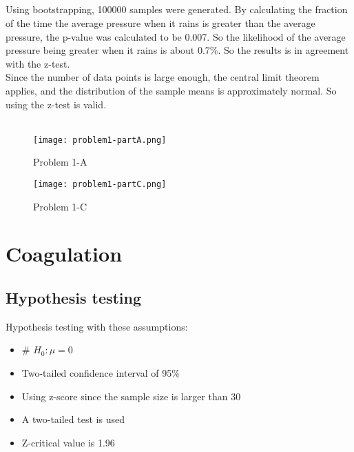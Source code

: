 \documentclass[12pt]{article}
\begin{document}
\subsection{}\label{subsec:problem-1-c}
Using bootstrapping, 100000 samples were generated.
By calculating the fraction of the time the average pressure when it rains is greater than the average pressure, the p-value was calculated to be 0.007.
So the likelihood of the average pressure being greater when it rains is about 0.7\%.
So the results is in agreement with the z-test.\\
Since the number of data points is large enough, the central limit theorem applies, and the distribution of the sample means is approximately normal.
So using the z-test is valid.\\
\\

\begin{figure}
\begin{center}
\texttt{[image: problem1-partA.png]}
\caption{Problem 1-A}
\end{center}
\end{figure}

\begin{figure}
\begin{center}
\texttt{[image: problem1-partC.png]}
\caption{Problem 1-C}
\end{center}
\end{figure}

\newpage
\section{Coagulation}\label{sec:problem-2}
\subsection{Hypothesis testing}\label{subsec:problem-2-a}
Hypothesis testing with these assumptions:
    \begin{itemize}
        \item # $H_0: \mu = 0$
        \item Two-tailed confidence interval of 95\%
        \item Using z-score since the sample size is larger than 30
        \item A two-tailed test is used
        \item Z-critical value is 1.96
        \end{itemize}
\end{document}
